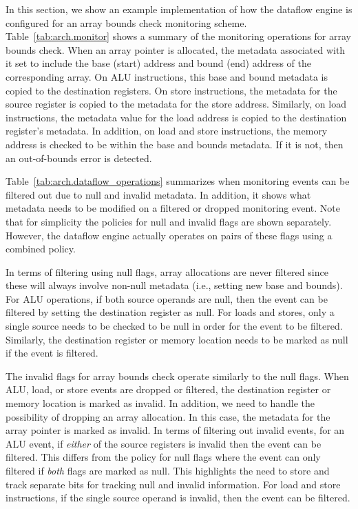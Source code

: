 In this section, we show an example implementation of how the dataflow engine
is configured for an array bounds check monitoring scheme.
Table~\ref{tab:arch.monitor} shows a summary of the monitoring operations for
array bounds check.  When an array pointer is allocated, the metadata
associated with it set to include the base (start) address and bound (end)
address of the corresponding array. On ALU instructions, this base and bound
metadata is copied to the destination registers. On store instructions, the
metadata for the source register is copied to the metadata for the store
address. Similarly, on load instructions, the metadata value for the load
address is copied to the destination register's metadata. In addition, on load
and store instructions, the memory address is checked to be within the base and
bounds metadata. If it is not, then an out-of-bounds error is detected. 

Table~\ref{tab:arch.dataflow_operations} summarizes when monitoring events
can be filtered out due to null and invalid metadata. In addition, it shows
what metadata needs to be modified on a filtered or dropped monitoring event.
Note that for simplicity the policies for null and invalid flags are shown
separately. However, the dataflow engine actually operates on pairs of these
flags using a combined policy.

In terms of filtering using null flags, array allocations are never filtered
since these will always involve non-null metadata (i.e., setting new base and
bounds). For ALU operations, if both source operands are null, then the event
can be filtered by setting the destination register as null. For loads and
stores, only a single source needs to be checked to be null in order for the
event to be filtered. Similarly, the destination register or memory location
needs to be marked as null if the event is filtered.

The invalid flags for array bounds check operate similarly to the null flags.
When ALU, load, or store events are dropped or filtered, the destination
register or memory location is marked as invalid. In addition, we need to
handle the possibility of dropping an array allocation. In this case, the metadata for the array
pointer is marked as invalid. In terms of filtering out invalid events, for an
ALU event, if \emph{either} of the source registers is invalid then the event can be
filtered. This differs from the policy for null flags where the event can only
filtered if \emph{both} flags are marked as null. This highlights the need to
store and track separate bits for tracking null and invalid information. For
load and store instructions, if the single source operand is invalid, then the
event can be filtered.

